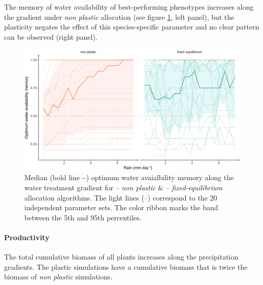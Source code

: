 The memory of water availability of best-performing phenotypes increases along the gradient under \textit{non plastic} allocation (see figure \ref{fig:gradient_w_ini_trend}, left panel), but the plasticity negates the effect of this species-specific parameter and no clear pattern can be observed (right panel).


\begin{figure}\label{fig:gradient_w_ini_trend}
\includegraphics[width = \textwidth]{./2_PP/Figures/Rain/best_w_ini_pl_rain_grad_alt.pdf}
\caption{Median (bold line \textbf{--}) optimum water avaialbility memory along the water treatment gradient for \textcolor{myOrange}{-- \textit{non plastic}} \&  \textcolor{myGreen}{-- \textit{fixed-equilibrium}} allocation algorithms. The light lines (--) correspond to the 20 independent parameter sets. The color ribbon marks the band between the 5th and 95th percentiles.} %
\end{figure}


\paragraph{Productivity}

The total cumulative biomass of all plants increases along the precipitation gradients. The plastic simulations have a cumulative biomass that is twice the biomass of \textit{non plastic} simulations.


